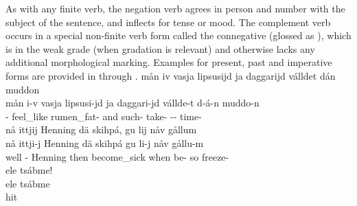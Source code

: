 As with any finite verb, the negation verb agrees in person and number with the subject of the sentence, and inflects for tense or mood. The complement verb occurs in a special non-finite verb form called the connegative (glossed as \CONNEGs), which is in the weak grade (when gradation is relevant) and otherwise lacks any additional morphological marking. Examples for present, past and imperative forms are provided in  through . 
\ea\label{connegEx1}%
\glll	mån iv vasja lipsusijd ja daggarijd válldet dán muddon\\
	mån i-v vasja lipsusi-jd ja daggari-jd vállde-t d-á-n muddo-n\\
	 - feel\_like\BS{} rumen\_fat- and such- take- -- time-\\\nopagebreak
{}	
\z
\ea\label{connegEx2}%
\glll	nå ittjij Henning dä skihpá, gu lij nåv gållum\\
	nå ittji-j Henning dä skihpá gu li-j nåv gållu-m\\
	well - Henning\BS{} then become\_sick\BS{} when be- so freeze-\\\nopagebreak
{}	
\z
\ea\label{negImpEx1}%
\glll	ele tsábme!\\
	ele tsábme\\
	\BS{} hit\BS{}\\\nopagebreak
{}	
\z




